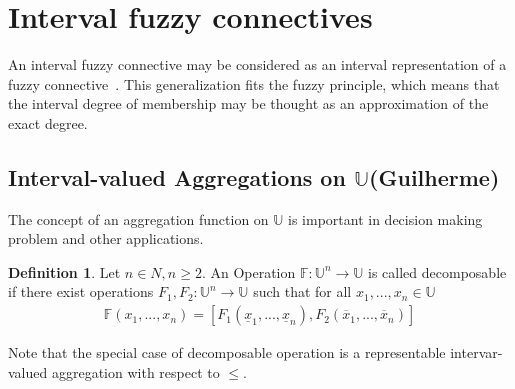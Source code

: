 \documentclass[conference]{IEEEtran}
\theoremstyle{plain}
\theoremstyle{remark}
\theoremstyle{definition}
\newtheorem{definition}[theorem]{Definition}
\theoremstyle{proposition}
\newcommand{\UU}{\mathbb{U} }
\begin{document}
\section{Interval fuzzy connectives}\label{sec-4}

 An interval fuzzy connective may be considered as an interval representation of a fuzzy connective~\cite{BT06b}. This generalization fits the fuzzy principle, which means that the interval degree of membership may be thought as an approximation of the exact degree.

\subsection{Interval-valued Aggregations on $\UU$(Guilherme)}

The concept of an aggregation function on $\UU$ is important in decision making problem and other applications.


\begin{comment}
\begin{definition}\label{def-intAggregation}
Let  $n \in N, n \geq 2$. An Operator $\mathbb{A} : (\UU)^n \rightarrow \UU$ is called an interval-valued aggregation function if it is increasing with respect to the order $\leq$, i.e
\begin{eqnarray}
\forall_{x_i,y_i \in \UU} x_i \leq y_i \Rightarrow \mathbb{A}(x_1,...,x_n) \leq \mathbb{A}(y_1,...,y_n)
\end{eqnarray}
and
\begin{eqnarray*}
\mathbb{A}(0,...,0) = 0, \mathbb{A}(1,...,1) = 1.
\end{eqnarray*}
\end{definition}
\end{comment}

\begin{definition}\label{def-intAgDecomposable}
Let  $n \in N, n \geq 2$. An Operation $\mathbb{F} : \UU^n \rightarrow \UU$ is called decomposable if there exist operations $F_1, F_2 : \UU^n \rightarrow \UU$ such that for all $x_1,...,x_n \in \UU$
\begin{eqnarray}
\mathbb{F}(x_1,...,x_n) = [F_1(\underline{x}_1,..., \underline{x}_n), F_2(\overline{x}_1,..., \overline{x}_n)]
\end{eqnarray}
\end{definition}

Note that the special case of decomposable operation is a representable intervar-valued aggregation with respect to $\leq$.
\end{document}
